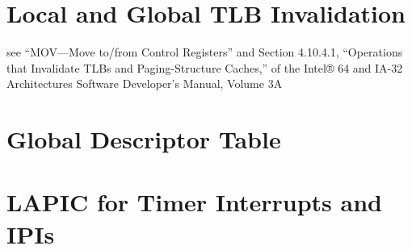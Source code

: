 % 
% 
% 
% 
% 
% 
% 


\section{Local and Global TLB Invalidation}


see “MOV—Move to/from Control Registers” and Section 4.10.4.1, “Operations that Invalidate TLBs and Paging-Structure Caches,” of the Intel® 64 and IA-32 Architectures Software Developer’s Manual, Volume 3A


\section{Global Descriptor Table}


\section{LAPIC for Timer Interrupts and IPIs}

